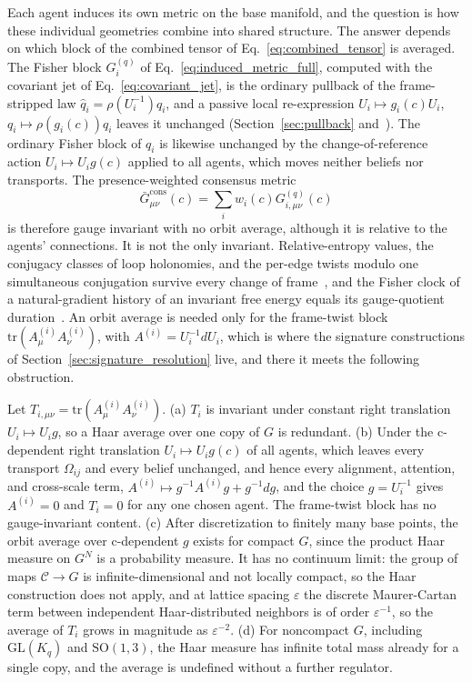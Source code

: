 Each agent induces its own metric on the base manifold, and the question is how these individual geometries combine into shared structure. The answer depends on which block of the combined tensor of Eq.~\eqref{eq:combined_tensor} is averaged. The Fisher block $G^{(q)}_i$ of Eq.~\eqref{eq:induced_metric_full}, computed with the covariant jet of Eq.~\eqref{eq:covariant_jet}, is the ordinary pullback of the frame-stripped law $\hat q_i = \rho(U_i^{-1}) q_i$, and a passive local re-expression $U_i \mapsto g_i(c) U_i$, $q_i \mapsto \rho(g_i(c)) q_i$ leaves it unchanged (Section~\ref{sec:pullback} and~\cite[Ch.~B2]{DennisGaugeVFESuppB2026}). The ordinary Fisher block of $q_i$ is likewise unchanged by the change-of-reference action $U_i \mapsto U_i g(c)$ applied to all agents, which moves neither beliefs nor transports. The presence-weighted consensus metric
\begin{equation}
\bar{G}^{\mathrm{cons}}_{\mu\nu}(c) = \sum_i w_i(c) G^{(q)}_{i,\mu\nu}(c)
\label{eq:consensus_metric_covariant}
\end{equation}
is therefore gauge invariant with no orbit average, although it is relative to the agents' connections. It is not the only invariant. Relative-entropy values, the conjugacy classes of loop holonomies, and the per-edge twists modulo one simultaneous conjugation survive every change of frame~\cite[Ch.~14]{DennisGaugeVFE2026}, and the Fisher clock of a natural-gradient history of an invariant free energy equals its gauge-quotient duration~\cite[Ch.~7]{DennisGaugeVFE2026}. An orbit average is needed only for the frame-twist block $\mathrm{tr}(A^{(i)}_\mu A^{(i)}_\nu)$, with $A^{(i)} = U_i^{-1} dU_i$, which is where the signature constructions of Section~\ref{sec:signature_resolution} live, and there it meets the following obstruction.
\begin{proposition}\label{prop:regulator_obstruction}
Let $T_{i,\mu\nu} = \mathrm{tr}(A^{(i)}_\mu A^{(i)}_\nu)$.
(a) $T_i$ is invariant under constant right translation $U_i \mapsto U_i g$, so a Haar average over one copy of $G$ is redundant.
(b) Under the c-dependent right translation $U_i \mapsto U_i g(c)$ of all agents, which leaves every transport $\Omega_{ij}$ and every belief unchanged, and hence every alignment, attention, and cross-scale term, $A^{(i)} \mapsto g^{-1} A^{(i)} g + g^{-1} dg$, and the choice $g = U_i^{-1}$ gives $A^{(i)} = 0$ and $T_i = 0$ for any one chosen agent. The frame-twist block has no gauge-invariant content.
(c) After discretization to finitely many base points, the orbit average over c-dependent $g$ exists for compact $G$, since the product Haar measure on $G^N$ is a probability measure. It has no continuum limit: the group of maps $\mathcal{C} \to G$ is infinite-dimensional and not locally compact, so the Haar construction does not apply, and at lattice spacing $\varepsilon$ the discrete Maurer-Cartan term between independent Haar-distributed neighbors is of order $\varepsilon^{-1}$, so the average of $T_i$ grows in magnitude as $\varepsilon^{-2}$.
(d) For noncompact $G$, including $\mathrm{GL}(K_q)$ and $\mathrm{SO}(1,3)$, the Haar measure has infinite total mass already for a single copy, and the average is undefined without a further regulator.
\end{proposition}
